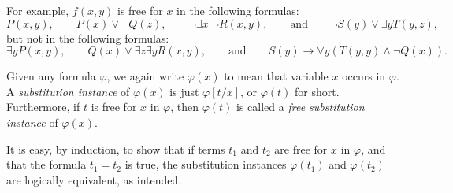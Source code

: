 \documentclass[12pt]{article}
\begin{document}
For example, $f(x,y)$ is free for $x$ in the following formulas:
$$P(x,y),\qquad P(x)\vee \neg Q(z), \qquad \neg \exists x \; \neg R(x,y), \qquad \mbox{and} \qquad \neg S(y) \vee \exists y T(y,z),$$
but not in the following formulas:
$$\exists y P(x,y),\qquad Q(x)\vee \exists z \exists y R(x,y), \qquad \mbox{and} \qquad S(y) \to \forall y (T(y,y)\wedge \neg Q(x)).$$

Given any formula $\varphi$, we again write $\varphi(x)$ to mean that variable $x$ occurs in $\varphi$.  A \emph{substitution instance} of $\varphi(x)$ is just $\varphi[t/x]$, or $\varphi(t)$ for short.  Furthermore, if $t$ is free for $x$ in $\varphi$, then $\varphi(t)$ is called a \emph{free substitution instance} of $\varphi(x)$.

It is easy, by induction, to show that if terms $t_1$ and $t_2$ are free for $x$ in $\varphi$, and that the formula $t_1=t_2$ is true, the substitution instances $\varphi(t_1)$ and $\varphi(t_2)$ are logically equivalent, as intended.

\end{document}
